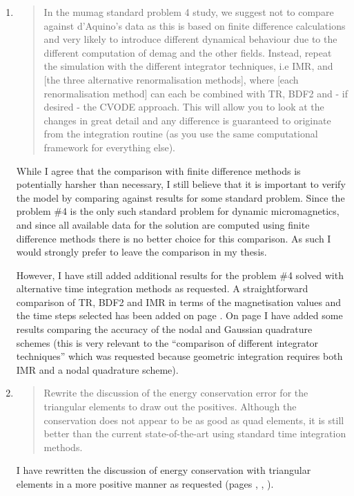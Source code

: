 \documentclass[12pt,a4paper,pdftex]{article}
\begin{document}
\begin{enumerate}
\item
  \begin{quotation}
    In the mumag standard problem 4 study, we suggest not to compare
    against d'Aquino's data as this is based on finite difference
    calculations and very likely to introduce different dynamical behaviour
    due to the different computation of demag and the other fields.
    Instead, repeat the simulation with the different integrator
    techniques, i.e IMR, and [the three alternative renormalisation
    methods], where [each renormalisation method] can each be combined with
    TR, BDF2 and - if desired - the CVODE approach. This will allow you to
    look at the changes in great detail and any difference is guaranteed to
    originate from the integration routine (as you use the same
    computational framework for everything else).
  \end{quotation}
  While I agree that the comparison with finite difference methods is potentially harsher than necessary, I still believe that it is important to verify the model by comparing against results for some standard problem.
  Since the \mumag problem \#4 is the only such standard problem for dynamic micromagnetics, and since all available data for the solution are computed using finite difference methods there is no better choice for this comparison.
  As such I would strongly prefer to leave the comparison in my thesis.

  However, I have still added additional results for the \mumag problem \#4 solved with alternative time integration methods as requested.
  A straightforward comparison of TR, BDF2 and IMR in terms of the magnetisation values and the time steps selected has been added on page \pageref{more-mumag4-correction-1}.
  On page \pageref{more-mumag4-correction-2} I have added some results comparing the accuracy of the nodal and Gaussian quadrature schemes (this is very relevant to the ``comparison of different integrator techniques'' which was requested because geometric integration requires both IMR and a nodal quadrature scheme).

\item
  \begin{quotation}
    Rewrite the discussion of the energy conservation error for the
    triangular elements to draw out the positives. Although the
    conservation does not appear to be as good as quad elements, it is
    still better than the current state-of-the-art using standard time
    integration methods.
  \end{quotation}
  I have rewritten the discussion of energy conservation with triangular elements in a more positive manner as requested (pages \pageref{sec:triangular-meshes}, \pageref{sec:numer-experiments-conclusions}, \pageref{sec:future-work}).

\end{enumerate}

\end{document}
